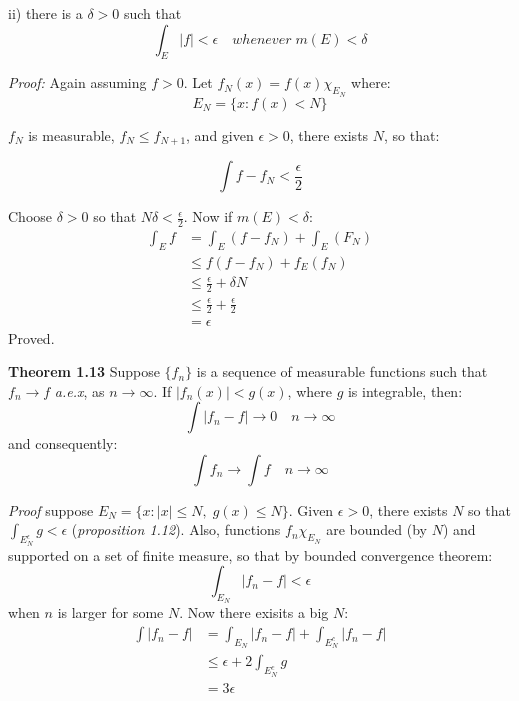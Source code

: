 \documentclass[
]{article}
\begin{document}
ii) there is a \(\delta > 0 \) such that
\[\int_E|f|<\epsilon\quad whenever\; m(E)<\delta\] 

\textit{Proof:}
Again assuming \(f > 0 \). Let \(f_N(x)=f(x)\chi_{E_N}\) where:
\[E_N=\{x: f(x)<N\}\]

\(f_N\) is measurable, \(f_N \leq f_{N+1}\), and given \(\epsilon>0\), there exists \(N\), so that:

\[\int f - f_N < \frac{\epsilon}{2}\]

Choose \(\delta > 0\) so that \(N\delta < \frac{\epsilon}{2}\). Now if \(m(E)<\delta\):
\[
  \begin{split}
  \int_E f &= \int_E(f-f_N)+\int_E(F_N)\\
  &\leq f (f - f_N) + f_E(f_N)\\
  &\leq \frac{\epsilon}{2}+\delta N\\
  &\leq \frac{\epsilon}{2}+\frac{\epsilon}{2}\\
  &=\epsilon
  \end{split}
  \]
Proved.

\textbf{Theorem 1.13} Suppose \(\{f_n\}\) is a sequence of measurable functions such that
\(f_n\to f\) \textit{a.e.x}, as \(n\to \infty\). If \(|f_n(x)|<g(x)\), where \(g\) is integrable,
then:
\[\int |f_n-f|\to 0 \quad n\to \infty\]
and consequently:
\[\int f_n \to \int f \quad n\to \infty\]

\textit{Proof} suppose \(E_N=\{x: |x|\leq N,\; g(x)\leq N\}\). Given \(\epsilon > 0\), there exists
\(N\) so that \(\int_{E_N^\epsilon}g < \epsilon\) (\textit{proposition 1.12}). Also, functions \(f_n\chi_{E_N}\)
are bounded (by \(N\)) and supported on a set of finite measure, so that by bounded convergence theorem:
\[\int_{E_N} |f_n - f| < \epsilon \] when \(n\) is larger for some \(N\). Now there exisits a big \(N\):
\[
  \begin{split}
    \int |f_n-f| &= \int_{E_N} |f_n-f| + \int_{E_N^c} |f_n-f|\\
    &\leq \epsilon + 2\int_{E_N^c}g\\
    &=3\epsilon
  \end{split}
\]
\end{document}
